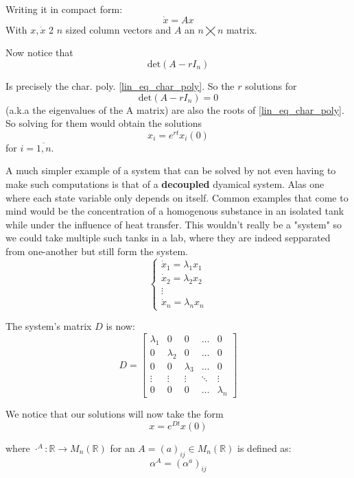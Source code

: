 Writing it in compact form:
\[
  \dot{x} = A x
\]
With $x, \dot{x}$ 2 $n$ sized column vectors and $A$ an $n \bigtimes n$ matrix.

Now notice that
\[
  \text{det}(A- r I_n)
\]

Is precisely the char. poly. \ref{lin_eq_char_poly}. So the $r$ solutions for
\[
  \text{det}(A - r I_n) =0
\]
(a.k.a the eigenvalues of the A matrix) are also the roots of \ref{lin_eq_char_poly}. So solving for them would obtain the solutions
\[
  x_i = e^{rt}x_i(0)
\]
for $i = \overline{1,n}$.

A much simpler example of a system that can be solved by not even having to make such computations is that of a \textbf{decoupled} dyamical system. Alas one where each state variable only depends on itself. Common examples that come to mind would be the concentration of a homogenous substance in an isolated tank while under the influence of heat transfer. This wouldn't really be a "system" so we could take multiple such tanks in a lab, where they are indeed sepparated from one-another but still form the system.
\begin{equation*}
  \begin{cases}
    \dot{x}_1 = \lambda_1 x_1 \\
    \dot{x}_2 = \lambda_2 x_2 \\
    \vdots \\
    \dot{x}_n = \lambda_n x_n
  \end{cases}
\end{equation*}

The system's matrix $D$ is now:
\begin{equation*}
  D =
  \begin{bmatrix}
    \lambda_1 & 0 & 0 &\dots & 0 \\
    0 & \lambda_2 & 0 & \dots & 0 \\
    0 & 0 & \lambda_3 & \dots & 0 \\
    \vdots & \vdots & \vdots & \ddots & \vdots \\
    0 & 0 & 0 & \dots & \lambda_n
  \end{bmatrix}
\end{equation*}

We notice that our solutions will now take the form
\[
  x = e^{Dt}x(0)
\]

where $\cdot^A : \mathbb{R} \rightarrow M_n(\mathbb{R})$ for an $A = (a)_{ij} \in M_n(\mathbb{R})$ is defined as:
\[
  \alpha^A = (\alpha^a)_{ij}
\]

